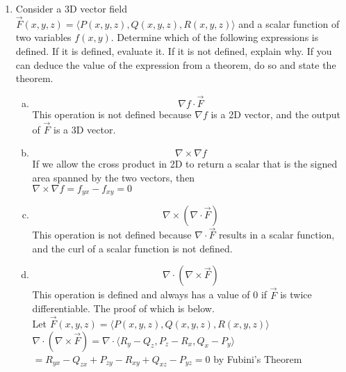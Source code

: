 \begin{enumerate}
	\item Consider a 3D vector field $\vec{F}(x,y,z) = \langle P(x,y,z), Q(x,y,z), R(x,y,z) \rangle$ and a scalar function of two variables $f(x,y)$. Determine which of the following expressions is defined. If it is defined, evaluate it. If it is not defined, explain why. If you can deduce the value of the expression from a theorem, do so and state the theorem.
	\begin{enumerate}[a.]
		\item \begin{equation*}
			\nabla f \cdot \vec{F}
		\end{equation*}
		\indent
		This operation is not defined because $\nabla f$ is a 2D vector, and the output of $\vec{F}$ is a 3D vector.\\
		
		\item \begin{equation*}
			\nabla \times \nabla f
		\end{equation*}
		\indent
		If we allow the cross product in 2D to return a scalar that is the signed area spanned by the two vectors, then\\
		$\nabla \times \nabla f = f_{yx} - f_{xy} = 0$\\
		
		\item $$\nabla\times(\nabla\cdot\vec{F})$$
		\indent
		This operation is not defined because $\nabla \cdot \vec{F}$ results in a scalar function, and the curl of a scalar function is not defined.\\
		
		\item $$\nabla \cdot (\nabla \times \vec{F})$$
		\indent
		This operation is defined and always has a value of 0 if $\vec{F}$ is twice differentiable. The proof of which is below.\\
		Let $\vec{F}(x,y,z) = \langle P(x,y,z), Q(x,y,z), R(x,y,z) \rangle$\\
		$\nabla \cdot (\nabla \times \vec{F}) = \nabla \cdot \langle R_y-Q_z, P_z-R_x, Q_x-P_y \rangle$\\
		$= R_{yx}-Q_{zx} + P_{zy}-R_{xy} + Q_{xz}-P_{yz} = 0$ by Fubini's Theorem\\
	\end{enumerate}


\end{enumerate}
